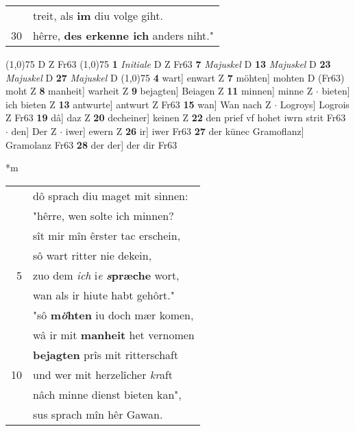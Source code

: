 \documentclass[8pt,a4paper,notitlepage]{article}
\begin{document}
\begin{table}[ht]
\begin{minipage}[t]{0.5\linewidth}
\begin{tabular}{rl}
 & treit, als \textbf{im} diu volge giht.\\ 
30 & hêrre, \textbf{des erkenne ich} anders niht."\\ 
\end{tabular}
\scriptsize
\line(1,0){75} \newline
D Z Fr63 \newline
\line(1,0){75} \newline
\textbf{1} \textit{Initiale} D Z Fr63  \textbf{7} \textit{Majuskel} D  \textbf{13} \textit{Majuskel} D  \textbf{23} \textit{Majuskel} D  \textbf{27} \textit{Majuskel} D  \newline
\line(1,0){75} \newline
\textbf{4} wart] enwart Z \textbf{7} möhten] mohten D (Fr63) moht Z \textbf{8} manheit] warheit Z \textbf{9} bejagten] Beiagen Z \textbf{11} minnen] minne Z  $\cdot$ bieten] ich bieten Z \textbf{13} antwurte] antwurt Z Fr63 \textbf{15} wan] Wan nach Z  $\cdot$ Logroys] Logrois Z Fr63 \textbf{19} dâ] daz Z \textbf{20} decheiner] keinen Z \textbf{22} den prief vf hohet iwrn strit Fr63  $\cdot$ den] Der Z  $\cdot$ iwer] ewern Z \textbf{26} ir] iwer Fr63 \textbf{27} der künec Gramoflanz] Gramolanz Fr63 \textbf{28} der der] der dir Fr63 \newline
\end{minipage}
\hspace{0.5cm}
\begin{minipage}[t]{0.5\linewidth}
\small
\begin{center}*m
\end{center}
\begin{tabular}{rl}
 & dô sprach diu maget mit sinnen:\\ 
 & "hêrre, wen solte ich minnen?\\ 
 & sît mir mîn êrster tac erschein,\\ 
 & sô wart ritter nie dekein,\\ 
5 & zuo dem \textit{ich} i\textit{e} \textbf{\textit{s}præche} wort,\\ 
 & wan als ir hiute habt gehôrt."\\ 
 & "sô \textbf{m\textit{ö}hten} iu doch mær komen,\\ 
 & wâ ir mit \textbf{manheit} het vernomen\\ 
 & \textbf{bejagten} prîs mit ritterschaft\\ 
10 & und wer mit herzelîcher \textit{kr}aft\\ 
 & nâch minne dienst bieten kan",\\ 
 & sus sprach mîn hêr Gawan.\\ 

\end{tabular}
\end{minipage}
\end{table}
\end{document}
